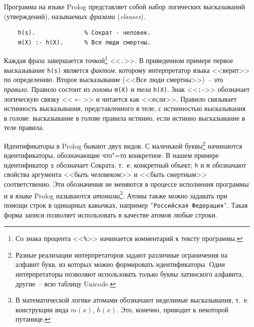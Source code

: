 \documentclass[a4paper,14pt, openany, twoside, final]{extbook} %
\newcommand{\eeng}[1]{\emph{\foreignlanguage{english}{#1}}}
\begin{document}
Программа на языке Prolog представляет собой набор логических высказываний (утверждений), называемых \emph{фразами} (\eeng{clauses}).

\begin{verbatim}
    h(s).              % Сократ - человек.
    m(X) :- h(X).      % Все люди смертны.
\end{verbatim}

  Каждая фраза завершается точкой\footnote{Со знака процента <<\texttt{\%}>> начинается комментарий к тексту программы.}  <<\texttt{.}>>.  В приведенном примере первое высказывание \texttt{h(s)} является \emph{фактом}, которому интерпретатор языка <<верит>> по определению.  Второе высказывание (<<Все люди смертны>>)~-- это \emph{правило}.  Правило состоит из \emph{головы} \texttt{m(X)} и \emph{тела} \texttt{h(X)}.  Знак <<\texttt{:-}>> обозначает логическую связку <<$\leftarrow$>> и читается как <<если>>.  Правило связывает истинность высказывания, представленного в теле, с истинностью высказывания в голове: высказывание в голове правила истинно, если истинно высказывание в теле правила.


Идентификаторы в Prolog бывают двух видов.  С маленькой буквы\footnote{Разные реализации интерпретаторов задают различные ограничения на алфавит букв, из которых можно формировать идентификаторы.  Одни интерпретаторы позволяют использовать только буквы латинского алфавита, другие~-- всю таблицу Unicode.} начинаются идентификаторы, обозначающие что"=то конкретное.  В нашем примере идентификатор \texttt{s} обозначает Сократа, т.~е. конкретный объект; \texttt{h} и \texttt{m} обозначают свойства аргумента <<быть человеком>> и <<быть смертным>> соответственно.  Эти обозначения не меняются в процессе исполнения программы и в языке Prolog называются \emph{атомами}\footnote{В математической логике атомами обозначают неделимые высказывания, т.~е. конструкции вида $m(x)$, $h(x)$.  Это, конечно, приводит к некоторой путанице.}.  Атомы также можно задавать при помощи строк в одинарных кавычках, например \texttt{'Российская Федерация'}.  Такая форма записи позволяет использовать в качестве атомов любые строки.
\end{document}

